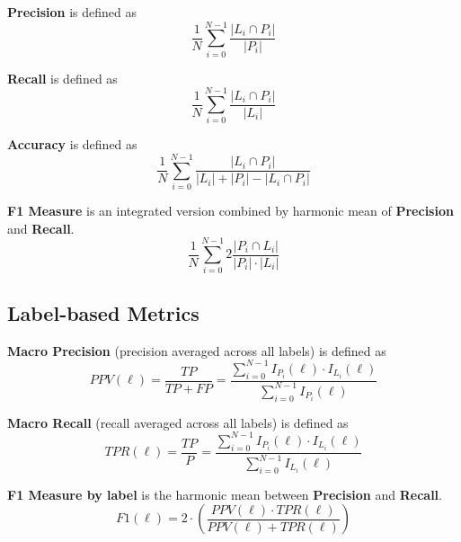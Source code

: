 \textbf{Precision} is defined as
\begin{equation}\label{eq:Precision}
\frac{1}{N} \sum_{i=0}^{N-1} \frac{\left|L_i \cap P_i\right|}{\left|P_i\right|}
\end{equation}

\textbf{Recall} is defined as
\begin{equation}\label{eq:Recall}
\frac{1}{N} \sum_{i=0}^{N-1} \frac{\left|L_i \cap P_i\right|}{\left|L_i\right|}
\end{equation}

\textbf{Accuracy} is defined as
\begin{equation}\label{eq:Accuracy}
\frac{1}{N} \sum_{i=0}^{N - 1} \frac{\left|L_i \cap P_i \right|}
        {\left|L_i\right| + \left|P_i\right| - \left|L_i \cap P_i \right|}
\end{equation}

\textbf{F1 Measure} is an integrated version combined by harmonic mean of \textbf{Precision} and \textbf{Recall}. 
\begin{equation}\label{eq:Accuracy}
\frac{1}{N} \sum_{i=0}^{N-1} 2 \frac{\left|P_i \cap L_i\right|}{\left|P_i\right| \cdot \left|L_i\right|}
\end{equation}

\subsection{Label-based Metrics}

\textbf{Macro Precision} (precision averaged across all labels) is defined as
\begin{equation}\label{eq:MacroPrecision}
PPV(\ell)=\frac{TP}{TP + FP}=
          \frac{\sum_{i=0}^{N-1} I_{P_i}(\ell) \cdot I_{L_i}(\ell)}
          {\sum_{i=0}^{N-1} I_{P_i}(\ell)}
\end{equation}

\textbf{Macro Recall} (recall averaged across all labels) is defined as
\begin{equation}\label{eq:MacroRecall}
TPR(\ell)=\frac{TP}{P}=
          \frac{\sum_{i=0}^{N-1} I_{P_i}(\ell) \cdot I_{L_i}(\ell)}
          {\sum_{i=0}^{N-1} I_{L_i}(\ell)}
\end{equation}

\textbf{F1 Measure by label} is the harmonic mean between \textbf{Precision} and \textbf{Recall}. 
\begin{equation}\label{eq:LabelAccuracy}
F1(\ell) = 2
                            \cdot \left(\frac{PPV(\ell) \cdot TPR(\ell)}
                            {PPV(\ell) + TPR(\ell)}\right)
\end{equation}

